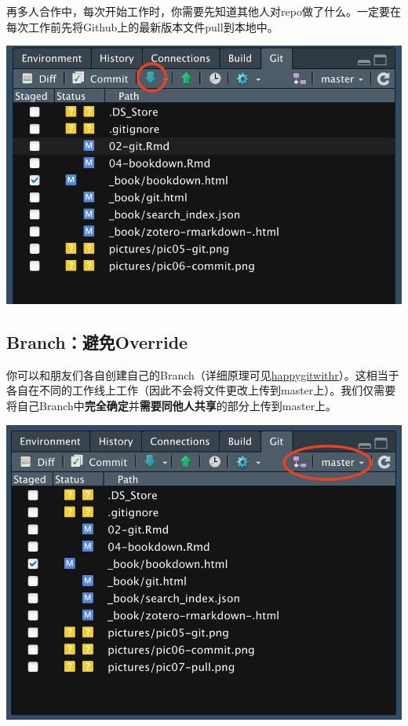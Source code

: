 \documentclass[
  letterpaper,
  DIV=11,
  numbers=noendperiod,
  oneside]{scrreprt}
\begin{document}
再多人合作中，每次开始工作时，你需要先知道其他人对repo做了什么。一定要在每次工作前先将Github上的最新版本文件pull到本地中。

\includegraphics{./images/git_pull.png}

\hypertarget{branchux907fux514doverride}{%
\subsection{Branch：避免Override}\label{branchux907fux514doverride}}

你可以和朋友们各自创建自己的Branch（详细原理可见\href{https://happygitwithr.com/git-branches.html}{happygitwithr}）。这相当于各自在不同的工作线上工作（因此不会将文件更改上传到master上）。我们仅需要将自己Branch中\textbf{完全确定}并\textbf{需要同他人共享}的部分上传到master上。

\includegraphics{./images/git_branch.png}
\end{document}
